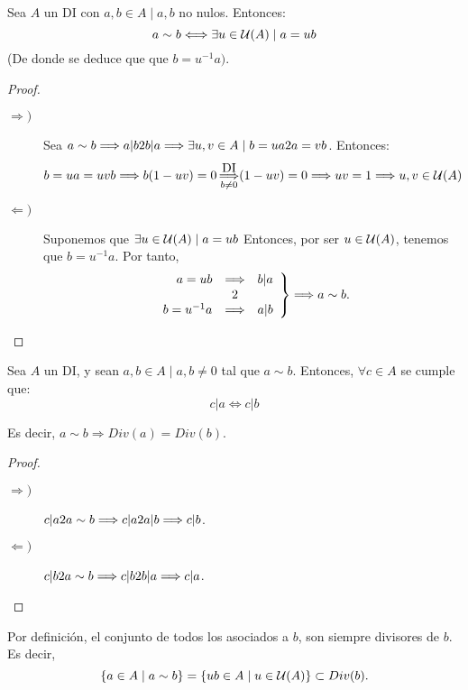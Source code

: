 \begin{prop}
    Sea $A$ un DI con $a,b \in A \mid a,b$ no nulos. Entonces:
    $$a\sim b \Longleftrightarrow \exists u \in \mathcal{U}(A) \mid a=ub$$
    (De donde se deduce que que $b = u^{-1}a)$.
\end{prop}
\begin{proof} \
\begin{description}
    \item [$\Longrightarrow)$] Sea $a\sim b \Longrightarrow a|b 2 b|a \Longrightarrow \exists u,v \in A \mid b=ua 2 a=vb$. Entonces:
    $$b=ua=uvb \Longrightarrow b(1-uv)=0 \mathop{\Longrightarrow}^{\mbox{DI}}_{b\neq0} (1-uv)=0 \Longrightarrow uv = 1
        \Longrightarrow u,v \in \mathcal{U}(A)$$
        
    \item [$\Longleftarrow)$] Suponemos que $\exists u \in \mathcal{U}(A) \mid a=ub$ Entonces, por ser $u\in \mathcal{U}(A)$, tenemos que $b=u^{-1}a$. Por tanto,
        $$\left. \begin{array}{rcl}
            a=ub &\Longrightarrow& b|a \\ &2 & \\
            b=u^{-1}a &\Longrightarrow& a|b
        \end{array} \right\} \Longrightarrow a\sim b.$$
\end{description} 
\end{proof}

\begin{lema}
    Sea $A$ un DI, y sean $a,b\in A\mid a,b\neq 0$ tal que $a\sim b$. Entonces, $\forall c\in A$ se cumple que:
    $$c|a \Longleftrightarrow c|b$$
    
    Es decir, $a\sim b \Longrightarrow Div(a)=Div(b)$.
\end{lema}
\begin{proof}\
    \begin{description}
        \item[$\Longrightarrow)$] $c|a 2 a\sim b \Longrightarrow c|a 2 a|b \Longrightarrow c|b$.
        \item[$\Longleftarrow)$] $c|b 2 a\sim b \Longrightarrow c|b 2 b|a \Longrightarrow c|a$.
    \end{description}
\end{proof}

Por definición, el conjunto de todos los asociados a $b$, son siempre divisores de $b$. Es decir,
$$\{a\in A \mid a\sim b\} = \{ub \in A \mid u\in \mathcal{U}(A)\}\subset Div(b).$$


